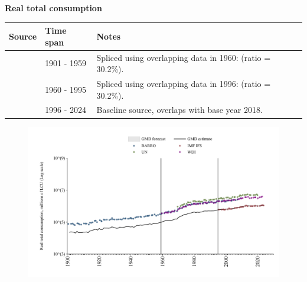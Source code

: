 \documentclass[12pt,a4paper,landscape]{article}
\begin{document}
\begin{adjustbox}{max totalsize={\paperwidth}{\paperheight},center}
\begin{minipage}[t][\textheight][t]{\textwidth}
\vspace*{0.5cm}
{}
\begin{center}
{\Large\bfseries Real total consumption}
\end{center}
\vspace{0.5cm}
\begin{table}[H]
\centering
\small
\begin{tabular}{|l|l|l|}
\hline
\textbf{Source} & \textbf{Time span} & \textbf{Notes} \\
\hline
\rowcolor{white}\cite{BARRO}& 1901 - 1959 &Spliced using overlapping data in 1960: (ratio = 30.2\%). \\
\rowcolor{lightgray}\cite{WDI}& 1960 - 1995 &Spliced using overlapping data in 1996: (ratio = 30.2\%). \\
\rowcolor{white}\cite{IMF_IFS}& 1996 - 2024 &Baseline source, overlaps with base year 2018. \\
\hline
\end{tabular}
\end{table}
\begin{figure}[H]
\centering
\includegraphics[width=\textwidth,height=0.6\textheight,keepaspectratio]{graphs/BRA_rcons.pdf}
\end{figure}
\end{minipage}
\end{adjustbox}
\end{document}
